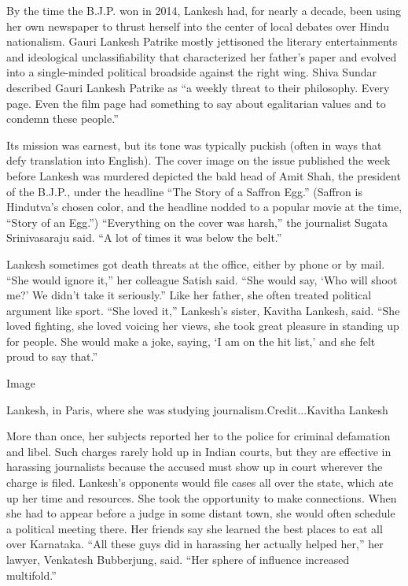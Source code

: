 By the time the B.J.P. won in 2014, Lankesh had, for nearly a decade,
been using her own newspaper to thrust herself into the center of local
debates over Hindu nationalism. Gauri Lankesh Patrike mostly jettisoned
the literary entertainments and ideological unclassifiability that
characterized her father's paper and evolved into a single-minded
political broadside against the right wing. Shiva Sundar described Gauri
Lankesh Patrike as ``a weekly threat to their philosophy. Every page.
Even the film page had something to say about egalitarian values and to
condemn these people.''

Its mission was earnest, but its tone was typically puckish (often in
ways that defy translation into English). The cover image on the issue
published the week before Lankesh was murdered depicted the bald head of
Amit Shah, the president of the B.J.P., under the headline ``The Story
of a Saffron Egg.'' (Saffron is Hindutva's chosen color, and the
headline nodded to a popular movie at the time, ``Story of an Egg.'')
``Everything on the cover was harsh,'' the journalist Sugata
Srinivasaraju said. ``A lot of times it was below the belt.''

Lankesh sometimes got death threats at the office, either by phone or by
mail. ``She would ignore it,'' her colleague Satish said. ``She would
say, `Who will shoot me?' We didn't take it seriously.'' Like her
father, she often treated political argument like sport. ``She loved
it,'' Lankesh's sister, Kavitha Lankesh, said. ``She loved fighting, she
loved voicing her views, she took great pleasure in standing up for
people. She would make a joke, saying, `I am on the hit list,' and she
felt proud to say that.''

Image

Lankesh, in Paris, where she was studying journalism.Credit...Kavitha
Lankesh

More than once, her subjects reported her to the police for criminal
defamation and libel. Such charges rarely hold up in Indian courts, but
they are effective in harassing journalists because the accused must
show up in court wherever the charge is filed. Lankesh's opponents would
file cases all over the state, which ate up her time and resources. She
took the opportunity to make connections. When she had to appear before
a judge in some distant town, she would often schedule a political
meeting there. Her friends say she learned the best places to eat all
over Karnataka. ``All these guys did in harassing her actually helped
her,'' her lawyer, Venkatesh Bubberjung, said. ``Her sphere of influence
increased multifold.''

